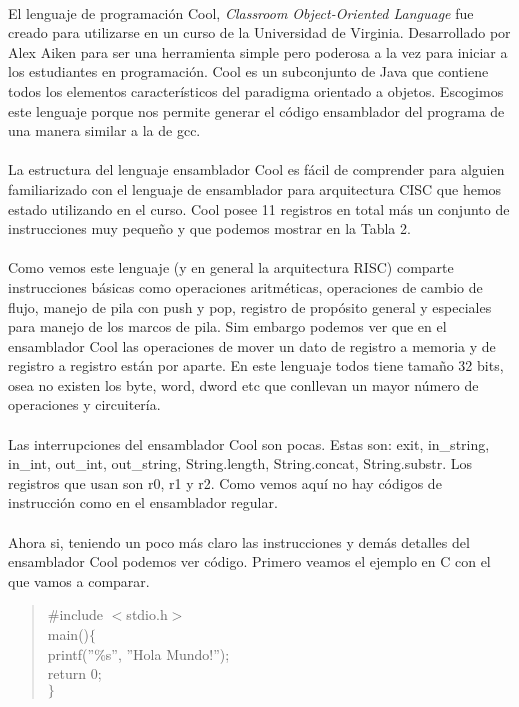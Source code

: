 \documentclass[10pt,a4paper]{article}
\begin{document}
\paragraph{}
El lenguaje de programación Cool, \textit{Classroom Object-Oriented Language} fue creado para utilizarse en un curso de la Universidad de Virginia. Desarrollado por Alex Aiken para ser una herramienta simple pero poderosa a la vez para iniciar a los estudiantes en programación. Cool es un subconjunto de Java que contiene todos los elementos característicos del paradigma orientado a objetos. Escogimos este lenguaje porque nos permite generar el código ensamblador del programa de una manera similar a la de gcc.
\paragraph{}
La estructura del lenguaje ensamblador Cool es fácil de comprender para alguien familiarizado con el lenguaje de ensamblador para arquitectura CISC que hemos estado utilizando en el curso. Cool posee 11 registros en total más un conjunto de instrucciones muy pequeño y que podemos mostrar en la Tabla 2.

\paragraph{}
Como vemos este lenguaje (y en general la arquitectura RISC) comparte instrucciones básicas como operaciones aritméticas, 
operaciones de cambio de flujo, manejo de pila con push y pop, registro de propósito general y especiales para manejo de los marcos de pila. Sim embargo podemos ver que en el ensamblador Cool las operaciones de mover un dato de registro a memoria y de registro a registro están por aparte. En este lenguaje todos tiene tamaño 32 bits, osea no existen los byte, word, dword etc que conllevan un mayor número de operaciones y circuitería.

\paragraph{}
Las interrupciones del ensamblador Cool son pocas. Estas son: exit, in\_string, in\_int, out\_int, out\_string, String.length, String.concat, String.substr. Los registros que usan son r0, r1 y r2. Como vemos aquí no hay códigos de instrucción como en el ensamblador regular.

\paragraph{}
Ahora si, teniendo un poco más claro las instrucciones y demás detalles del ensamblador Cool podemos ver código. Primero veamos el ejemplo en C con el que vamos a comparar.
\begin{quote}
\#include $<$stdio.h$>$\\
main()$\lbrace$ \\
	\- printf(''\%s'', ''Hola Mundo!''); \\
	\- return 0;\\
$\rbrace$
\end{quote}
\end{document}
